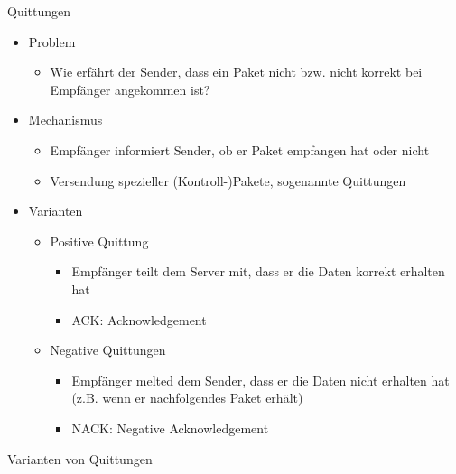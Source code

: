       Quittungen
      \begin{itemize}
        \item Problem
          \begin{itemize}
            \item Wie erfährt der Sender, dass ein Paket nicht bzw. nicht korrekt bei Empfänger
              angekommen ist?
          \end{itemize}
        \item Mechanismus
          \begin{itemize}
            \item Empfänger informiert Sender, ob er Paket empfangen hat oder nicht
            \item Versendung spezieller (Kontroll-)Pakete, sogenannte Quittungen
          \end{itemize}
        \item Varianten
          \begin{itemize}
            \item Positive Quittung
              \begin{itemize}
                \item Empfänger teilt dem Server mit, dass er die Daten korrekt erhalten hat
                \item ACK: Acknowledgement
              \end{itemize}
            \item Negative Quittungen
              \begin{itemize}
                \item Empfänger melted dem Sender, dass er die Daten nicht erhalten hat (z.B. wenn er 
                  nachfolgendes Paket erhält)
                \item NACK: Negative Acknowledgement
              \end{itemize}
          \end{itemize}
      \end{itemize}
      \pagebreak
      Varianten von Quittungen
